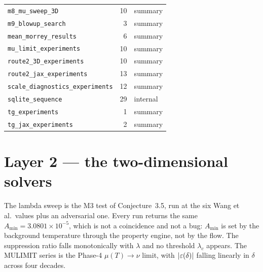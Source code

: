 \begin{center}
\begin{longtable}{@{}l r l@{}}
\texttt{m8\_mu\_sweep\_3D} & 10 & summary \\
\texttt{m9\_blowup\_search} & 3 & summary \\
\texttt{mean\_morrey\_results} & 6 & summary \\
\texttt{mu\_limit\_experiments} & 10 & summary \\
\texttt{route2\_3D\_experiments} & 10 & summary \\
\texttt{route2\_jax\_experiments} & 13 & summary \\
\texttt{scale\_diagnostics\_experiments} & 12 & summary \\
\texttt{sqlite\_sequence} & 29 & internal \\
\texttt{tg\_experiments} & 1 & summary \\
\texttt{tg\_jax\_experiments} & 2 & summary \\
\end{longtable}
\end{center}

\section{Layer 2 --- the two-dimensional solvers}
\label{sec:a1-l2}

The lambda sweep is the M3 test of Conjecture~3.5, run at the six
Wang et al.\ values plus an adversarial one. Every run returns the same
\(A_{\min}=3.0801\times10^{-5}\), which is not a coincidence and not a bug:
\(A_{\min}\) is set by the background temperature through the property engine,
not by the flow. The suppression ratio falls monotonically with \(\lambda\)
and no threshold \(\lambda_c\) appears. The MULIMIT series is the Phase-4
\(\mu(T)\to\nu\) limit, with \(\left|\varepsilon(\delta)\right|\) falling linearly in
\(\delta\) across four decades.

